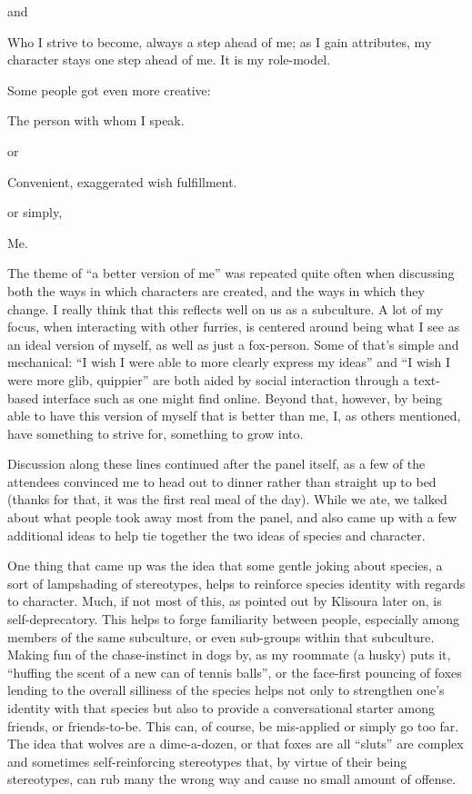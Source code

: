 and

Who I strive to become, always a step ahead of me; as I gain attributes, my character stays one step ahead of me. It is my role-model.

Some people got even more creative:

The person with whom I speak.

or

Convenient, exaggerated wish fulfillment.

or simply,

Me.

The theme of ``a better version of me'' was repeated quite often when discussing both the ways in which characters are created, and the ways in which they change. I really think that this reflects well on us as a subculture. A lot of my focus, when interacting with other furries, is centered around being what I see as an ideal version of myself, as well as just a fox-person. Some of that's simple and mechanical: ``I wish I were able to more clearly express my ideas'' and ``I wish I were more glib, quippier'' are both aided by social interaction through a text-based interface such as one might find online. Beyond that, however, by being able to have this version of myself that is better than me, I, as others mentioned, have something to strive for, something to grow into.

Discussion along these lines continued after the panel itself, as a few of the attendees convinced me to head out to dinner rather than straight up to bed (thanks for that, it was the first real meal of the day). While we ate, we talked about what people took away most from the panel, and also came up with a few additional ideas to help tie together the two ideas of species and character.

One thing that came up was the idea that some gentle joking about species, a sort of lampshading of stereotypes, helps to reinforce species identity with regards to character. Much, if not most of this, as pointed out by Klisoura later on, is self-deprecatory. This helps to forge familiarity between people, especially among members of the same subculture, or even sub-groups within that subculture. Making fun of the chase-instinct in dogs by, as my roommate (a husky) puts it, ``huffing the scent of a new can of tennis balls'', or the face-first pouncing of foxes lending to the overall silliness of the species helps not only to strengthen one's identity with that species but also to provide a conversational starter among friends, or friends-to-be. This can, of course, be mis-applied or simply go too far. The idea that wolves are a dime-a-dozen, or that foxes are all ``sluts'' are complex and sometimes self-reinforcing stereotypes that, by virtue of their being stereotypes, can rub many the wrong way and cause no small amount of offense.

